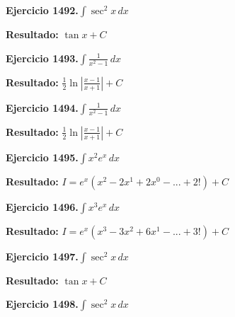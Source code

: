 \documentclass[10pt,a4paper]{article}
\begin{document}
\newpage
\begin{ejbox}
\textbf{Ejercicio 1492.}\quad $\int \sec^2 x\,dx$
\end{ejbox}

\begin{solbox}
\textbf{Resultado:} \(\displaystyle \tan x + C\)
\end{solbox}

\begin{ejbox}
\textbf{Ejercicio 1493.}\quad $\int \frac{1}{x^2-1}\,dx$
\end{ejbox}

\begin{solbox}
\textbf{Resultado:} \(\displaystyle \frac{1}{2}\ln\left|\frac{x-1}{x+1}\right| + C\)
\end{solbox}

\begin{ejbox}
\textbf{Ejercicio 1494.}\quad $\int \frac{1}{x^2-1}\,dx$
\end{ejbox}

\begin{solbox}
\textbf{Resultado:} \(\displaystyle \frac{1}{2}\ln\left|\frac{x-1}{x+1}\right| + C\)
\end{solbox}

\newpage
\begin{ejbox}
\textbf{Ejercicio 1495.}\quad $\int x^{2} e^x\,dx$
\end{ejbox}

\begin{solbox}
\textbf{Resultado:} \(\displaystyle I = e^x(x^{2} - 2x^{1} + 2x^{0} - ... + 2!) + C\)
\end{solbox}

\begin{ejbox}
\textbf{Ejercicio 1496.}\quad $\int x^{3} e^x\,dx$
\end{ejbox}

\begin{solbox}
\textbf{Resultado:} \(\displaystyle I = e^x(x^{3} - 3x^{2} + 6x^{1} - ... + 3!) + C\)
\end{solbox}

\begin{ejbox}
\textbf{Ejercicio 1497.}\quad $\int \sec^2 x\,dx$
\end{ejbox}

\begin{solbox}
\textbf{Resultado:} \(\displaystyle \tan x + C\)
\end{solbox}

\newpage
\begin{ejbox}
\textbf{Ejercicio 1498.}\quad $\int \sec^2 x\,dx$
\end{ejbox}
\end{document}
